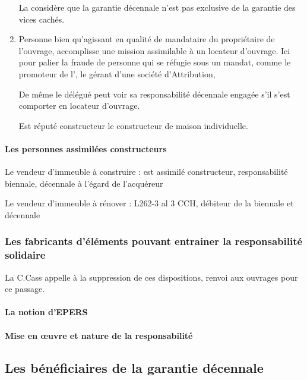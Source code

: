 \begin{enumerate}
				La \JP considère que la garantie décennale n’est pas exclusive de la garantie des vices cachés.

				\item Personne bien qu’agissant en qualité de mandataire du propriétaire de l’ouvrage, accomplisse une mission assimilable à un locateur d’ouvrage. Ici pour palier la fraude de personne qui se réfugie sous un mandat, comme le promoteur de l', le gérant d’une société d’Attribution, \etc

				De même le \MO délégué peut voir sa responsabilité décennale engagée s’il s’est comporter en locateur d’ouvrage.

				Est réputé constructeur le constructeur de maison individuelle.
			\end{enumerate}



			\paragraph{Les personnes assimilées constructeurs}

			Le vendeur d’immeuble à construire : est assimilé constructeur, responsabilité biennale, décennale à l’égard de l’acquéreur

			Le vendeur d’immeuble à rénover : L262-3 al 3 CCH, débiteur de la biennale et décennale


		\subsubsection{Les fabricants d'éléments pouvant entrainer la responsabilité solidaire}

		La C.Cass appelle à la suppression de ces dispositions, renvoi aux ouvrages pour ce passage.

			\paragraph{La notion d'EPERS}

				\aCompleter

			\paragraph{Mise en œuvre et nature de la responsabilité}

				\aCompleter

	\subsection{Les bénéficiaires de la garantie décennale}

